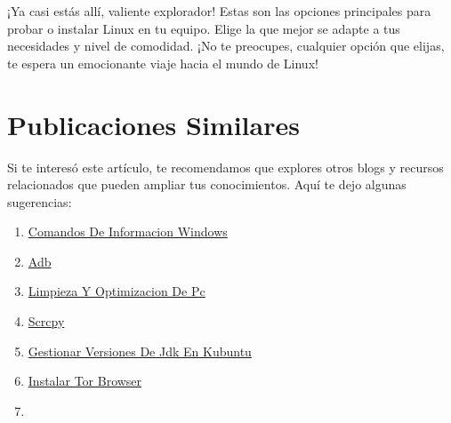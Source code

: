 \documentclass[
  jou,
  floatsintext,
  longtable,
  a4paper,
  nolmodern,
  notxfonts,
  notimes,
  12pt,
  colorlinks=true,linkcolor=blue,citecolor=blue,urlcolor=blue]{apa7}
\providecommand{\tightlist}{%
  \setlength{\itemsep}{0pt}\setlength{\parskip}{0pt}}
\begin{document}
¡Ya casi estás allí, valiente explorador! Estas son las opciones
principales para probar o instalar Linux en tu equipo. Elige la que
mejor se adapte a tus necesidades y nivel de comodidad. ¡No te
preocupes, cualquier opción que elijas, te espera un emocionante viaje
hacia el mundo de Linux!

\section{Publicaciones Similares}\label{publicaciones-similares}

Si te interesó este artículo, te recomendamos que explores otros blogs y
recursos relacionados que pueden ampliar tus conocimientos. Aquí te dejo
algunas sugerencias:

\begin{enumerate}
\def\labelenumi{\arabic{enumi}.}
\tightlist
\item
  \href{https://chaska-x.netlify.app/operating-system/2017-05-21-comandos-de-informacion-windows/index.pdf}{}
  \href{https://chaska-x.netlify.app/operating-system/2017-05-21-comandos-de-informacion-windows}{Comandos
  De Informacion Windows}
\item
  \href{https://chaska-x.netlify.app/operating-system/2019-06-19-adb/index.pdf}{}
  \href{https://chaska-x.netlify.app/operating-system/2019-06-19-adb}{Adb}
\item
  \href{https://chaska-x.netlify.app/operating-system/2021-08-17-limpieza-y-optimizacion-de-pc/index.pdf}{}
  \href{https://chaska-x.netlify.app/operating-system/2021-08-17-limpieza-y-optimizacion-de-pc}{Limpieza
  Y Optimizacion De Pc}
\item
  \href{https://chaska-x.netlify.app/operating-system/2021-10-21-scrcpy/index.pdf}{}
  \href{https://chaska-x.netlify.app/operating-system/2021-10-21-scrcpy}{Scrcpy}
\item
  \href{https://chaska-x.netlify.app/operating-system/2022-05-12-gestionar-versiones-de-jdk-en-kubuntu/index.pdf}{}
  \href{https://chaska-x.netlify.app/operating-system/2022-05-12-gestionar-versiones-de-jdk-en-kubuntu}{Gestionar
  Versiones De Jdk En Kubuntu}
\item
  \href{https://chaska-x.netlify.app/operating-system/2022-07-21-instalar-tor-browser/index.pdf}{}
  \href{https://chaska-x.netlify.app/operating-system/2022-07-21-instalar-tor-browser}{Instalar
  Tor Browser}
\item

\end{enumerate}
\end{document}
